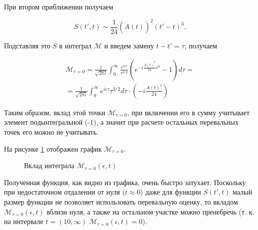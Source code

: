 \documentclass[%
bachelor,    %
natbib,      %
subf,        %
href,        %
colorlinks,  %
]{disser}
\newcommand{\cM}{\mathcal{M}}
\begin{document}
При втором приближении получаем

\begin{equation}\label{eq:S_0}
	S(t', t) \sim \frac{1}{24} \left( \dot{A}(t)\right)^{2}(t' - t)^3.
\end{equation}

Подставляя это $S$ в интеграл $\cM$ и введем замену $t - t' = \tau$, получаем 

\begin{eqnarray}
\cM_{\tau = 0} = \frac{1}{\sqrt{2\pi i}} \int_{0}^{\infty} \frac{e^{i \epsilon \tau}}{\tau^{3/2}} \left(e^{-i \frac{\dot{A(t)}^2}{24} \tau^3} - 1\right) d\tau  = \nonumber \\
= \frac{1}{\sqrt{2\pi i}} \int_{0}^{\infty} e^{i \epsilon \tau} \tau^{3/2} d\tau \cdot \left(-i\frac{\dot{A}(t)^2}{24}\right) \nonumber
\end{eqnarray}

Таким образом, вклад этой точки $\cM_{\tau = 0}$, при включении его в сумму учитывает элемент подынтегральной (-1), а значит при расчете остальных перевальных точек его можно не учитывать.

На рисунке \ref{ris:I_0} отображен график $\cM_{\tau = 0}$. 

\begin{figure}[h]
	\caption{Вклад интеграла $\cM_{\tau = 0}(\epsilon, t)$}
	\label{ris:I_0}
\end{figure}

Полученная функция, как видно из графика, очень быстро затухает. Поскольку при недостаточном отдалении от нуля ($t \approx 0$) даже для функции $S(t', t)$ малый размер функции не позволяет использовать перевальную оценку, то вкладом $\cM_{\tau = 0}(\epsilon, t)$ вблизи нуля, а также на остальном участке можно пренебречь (т. к. на интервале $t = (10, \infty)$ $\cM_{\tau = 0}(\epsilon, t) = 0$).  
\end{document}
